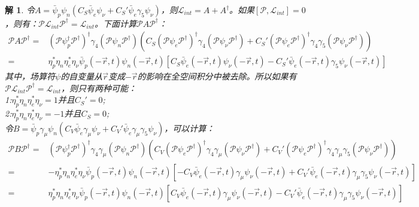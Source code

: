 \documentclass[UTF8,10pt,a4paper]{article}
\theoremstyle{Problem}%
\theoremstyle{Solution}%
\newtheorem*{sol}{解}%
\begin{document}
\begin{sol}
令$A = \bar{\psi}_p \psi_n(C_S\bar{\psi}_e \psi_\nu + C_S' \bar{\psi}_e \gamma_5 \psi_\nu)$，则$\mathcal{L}_{int} = A + A^\dagger$。如果$[\mathcal{P}, \mathcal{L}_{int}] = 0$，则有：$\mathcal{P} \mathcal{L}_{int} \mathcal{P}^\dagger = \mathcal{L}_{int}$。下面计算$\mathcal{P} A \mathcal{P}^\dagger$： 
\[
    \begin{aligned}
    \mathcal{P} A \mathcal{P}^\dagger =& (\mathcal{P} \psi_p^\dagger \mathcal{P}^\dagger)^\dagger \gamma_4 (\mathcal{P} \psi_n \mathcal{P}^\dagger) (C_S (\mathcal{P}\psi_e\mathcal{P}^\dagger)^\dagger \gamma_4 (\mathcal{P}\psi_\nu \mathcal{P}^\dagger) + C_S' (\mathcal{P} \psi_e \mathcal{P}^\dagger)^\dagger \gamma_4 \gamma_5 (\mathcal{P} \psi_\nu \mathcal{P}^\dagger)) \\
    =& \eta_p^* \eta_n \eta_e^* \eta_\nu \bar{\psi}_p(-\vec{r},t) \psi_n(-\vec{r},t) [C_S \bar{\psi}_e(-\vec{r},t) \psi_\nu(-\vec{r},t) - C_S' \bar{\psi}_e(-\vec{r},t) \gamma_5 \psi_\nu(-\vec{r},t)]
    \end{aligned}
\]
其中，场算符$\psi$的自变量从$\vec{r}$变成$-\vec{r}$的影响在全空间积分中被去除。所以如果有$\mathcal{P}\mathcal{L}_{int}\mathcal{P}^\dagger = \mathcal{L}_{int}$，则只有两种可能： \\
1:$\eta_p^* \eta_n \eta_e^* \eta_\nu = 1$并且$C_S' = 0$; \\
2:$\eta_p^* \eta_n \eta_e^* \eta_\nu = -1$并且$C_S = 0$; \\
令$B = \bar{\psi}_p \gamma_\mu \psi_n(C_V \bar{\psi}_e \gamma_\mu \psi_\nu + C_V' \bar{\psi}_e \gamma_\mu \gamma_5 \psi_\nu)$，可以计算：
\[
    \begin{aligned}
    \mathcal{P} B \mathcal{P}^\dagger =& (\mathcal{P} \psi_p^\dagger \mathcal{P}^\dagger)^\dagger \gamma_4 \gamma_\mu (\mathcal{P} \psi_n \mathcal{P}^\dagger) (C_V (\mathcal{P}\psi_e\mathcal{P}^\dagger)^\dagger \gamma_4 \gamma_\mu (\mathcal{P}\psi_\nu \mathcal{P}^\dagger) + C_V' (\mathcal{P} \psi_e \mathcal{P}^\dagger)^\dagger \gamma_4 \gamma_\mu \gamma_5 (\mathcal{P} \psi_\nu \mathcal{P}^\dagger)) \\
    =& -\eta_p^* \eta_n \eta_e^* \eta_\nu \bar{\psi}_p(-\vec{r},t) \psi_n(-\vec{r},t) [-C_V \bar{\psi}_e(-\vec{r},t) \gamma_\mu \psi_\nu(-\vec{r},t) + C_V' \bar{\psi}_e(-\vec{r},t) \gamma_\mu \gamma_5 \psi_\nu(-\vec{r},t)] \\
    =& \eta_p^* \eta_n \eta_e^* \eta_\nu \bar{\psi}_p(-\vec{r},t) \psi_n(-\vec{r},t) [C_V \bar{\psi}_e(-\vec{r},t) \gamma_\mu \psi_\nu(-\vec{r},t) - C_V' \bar{\psi}_e(-\vec{r},t) \gamma_\mu \gamma_5 \psi_\nu(-\vec{r},t)]
    \end{aligned}
\]
\end{sol}
\end{document}
